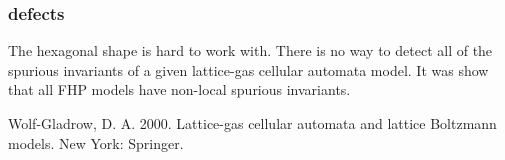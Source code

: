 \documentclass[a4paper,10pt]{article}
\begin{document}
\subsubsection{defects}
The hexagonal shape is hard to work with.
There is no way to detect all of the spurious invariants of a given
lattice-gas cellular automata model. It was show that all FHP models
have non-local spurious invariants.
\begin{thebibliography}{9}
Wolf-Gladrow, D. A. 2000. Lattice-gas cellular automata and lattice Boltzmann models. New York: Springer.
\end{thebibliography}
\end{document}
